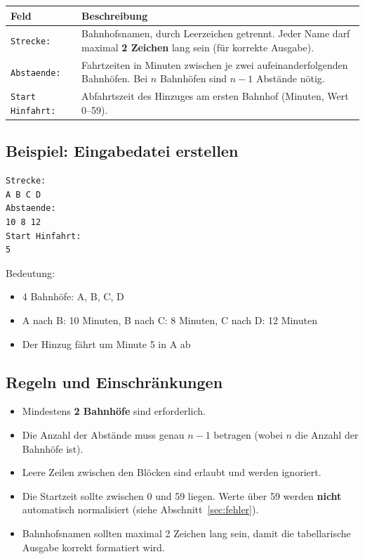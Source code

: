 \documentclass[12pt,a4paper]{article}
\begin{document}
\begin{center}
\begin{tabular}{lp{9cm}}
\toprule
\textbf{Feld} & \textbf{Beschreibung} \\
\midrule
\texttt{Strecke:} & Bahnhofsnamen, durch Leerzeichen getrennt. Jeder Name darf maximal \textbf{2 Zeichen} lang sein (für korrekte Ausgabe). \\
\texttt{Abstaende:} & Fahrtzeiten in Minuten zwischen je zwei aufeinanderfolgenden Bahnhöfen. Bei $n$ Bahnhöfen sind $n-1$ Abstände nötig. \\
\texttt{Start Hinfahrt:} & Abfahrtszeit des Hinzuges am ersten Bahnhof (Minuten, Wert 0--59). \\
\bottomrule
\end{tabular}
\end{center}

\subsection{Beispiel: Eingabedatei erstellen}

\begin{beispiel}[title={Strecke A--B--C--D mit vier Bahnhöfen}]
\begin{lstlisting}
Strecke:
A B C D
Abstaende:
10 8 12
Start Hinfahrt:
5
\end{lstlisting}

Bedeutung:
\begin{itemize}
    \item 4 Bahnhöfe: A, B, C, D
    \item A nach B: 10 Minuten, B nach C: 8 Minuten, C nach D: 12 Minuten
    \item Der Hinzug fährt um Minute 5 in A ab
\end{itemize}
\end{beispiel}

\subsection{Regeln und Einschränkungen}

\begin{itemize}
    \item Mindestens \textbf{2 Bahnhöfe} sind erforderlich.
    \item Die Anzahl der Abstände muss genau $n-1$ betragen (wobei $n$ die Anzahl der Bahnhöfe ist).
    \item Leere Zeilen zwischen den Blöcken sind erlaubt und werden ignoriert.
    \item Die Startzeit sollte zwischen 0 und 59 liegen. Werte über 59 werden \textbf{nicht} automatisch normalisiert (siehe Abschnitt~\ref{sec:fehler}).
    \item Bahnhofsnamen sollten maximal 2 Zeichen lang sein, damit die tabellarische Ausgabe korrekt formatiert wird.
\end{itemize}
\end{document}
